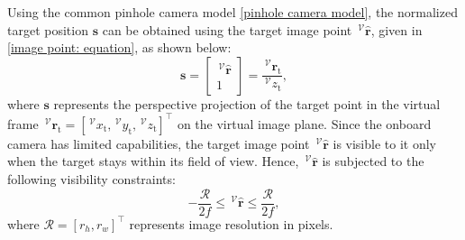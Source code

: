 \documentclass[lettersize,journal]{IEEEtran}
\begin{document}
Using the common pinhole camera model \eqref{pinhole camera model}, the normalized target position $\boldsymbol{s}$ can be obtained using the target image point $\,^\mathcal{V} \hat{\boldsymbol{r}}$, given in \eqref{image point: equation}, as shown below:
\begin{equation} \label{normalized_pos: equation}
    \boldsymbol{s} = \begin{bmatrix} \,^\mathcal{V} \hat{\boldsymbol{r}} \\ 1\end{bmatrix} = \frac{\,^\mathcal{V} \boldsymbol{r}_{\text{t}}}{\,^\mathcal{V} z_{\text{t}}},
\end{equation}
where $\boldsymbol{s}$ represents the perspective projection of the target point in the virtual frame $\,^\mathcal{V} \boldsymbol{r}_{\text{t}} = [\,^\mathcal{V} x_{\text{t}}, \,^\mathcal{V} y_{\text{t}}, \,^\mathcal{V} z_{\text{t}}]^{\top}$ on the virtual image plane.
Since the onboard camera has limited capabilities, the target image point $\,^\mathcal{V} \hat{\boldsymbol{r}}$ is visible to it only when the target stays within its field of view.
Hence, $\,^\mathcal{V} \hat{\boldsymbol{r}}$ is subjected to the following visibility constraints:
\begin{equation} \label{visibility_constraints}
    -\frac{\mathcal{R}}{2f} \leq \,^\mathcal{V} \hat{\boldsymbol{r}} \leq \frac{\mathcal{R}}{2f},
\end{equation}
 where $\mathcal{R} = [r_h, r_w]^\top$ represents image resolution in pixels.
\end{document}
